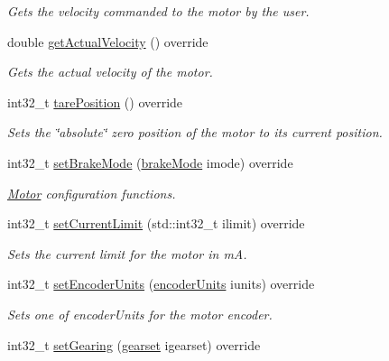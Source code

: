 \begin{DoxyCompactItemize}
\begin{DoxyCompactList}\small\item\em Gets the velocity commanded to the motor by the user. \end{DoxyCompactList}\item 
double \mbox{\hyperlink{classokapi_1_1MockMotor_a774e4436ae386aee9981c11ccd947e13}{get\+Actual\+Velocity}} () override
\begin{DoxyCompactList}\small\item\em Gets the actual velocity of the motor. \end{DoxyCompactList}\item 
int32\+\_\+t \mbox{\hyperlink{classokapi_1_1MockMotor_a80592813f7053d3468c99a7651e5514f}{tare\+Position}} () override
\begin{DoxyCompactList}\small\item\em Sets the \char`\"{}absolute\char`\"{} zero position of the motor to its current position. \end{DoxyCompactList}\item 
int32\+\_\+t \mbox{\hyperlink{classokapi_1_1MockMotor_a807d728157563cb1c5afc6eb324d31cc}{set\+Brake\+Mode}} (\mbox{\hyperlink{classokapi_1_1AbstractMotor_a132e0485dbb59a60c3f934338d8fa601}{brake\+Mode}} imode) override
\begin{DoxyCompactList}\small\item\em \mbox{\hyperlink{classokapi_1_1Motor}{Motor}} configuration functions. \end{DoxyCompactList}\item 
int32\+\_\+t \mbox{\hyperlink{classokapi_1_1MockMotor_a91cac378cf47e923beb44a681af4d830}{set\+Current\+Limit}} (std\+::int32\+\_\+t ilimit) override
\begin{DoxyCompactList}\small\item\em Sets the current limit for the motor in mA. \end{DoxyCompactList}\item 
int32\+\_\+t \mbox{\hyperlink{classokapi_1_1MockMotor_a955c121e844f7d78eecfc865b71979c5}{set\+Encoder\+Units}} (\mbox{\hyperlink{classokapi_1_1AbstractMotor_ae811cd825099f2defadeb1b7f7e7764c}{encoder\+Units}} iunits) override
\begin{DoxyCompactList}\small\item\em Sets one of encoder\+Units for the motor encoder. \end{DoxyCompactList}\item 
int32\+\_\+t \mbox{\hyperlink{classokapi_1_1MockMotor_a4e9c94656f43b69c489deeb82908e817}{set\+Gearing}} (\mbox{\hyperlink{classokapi_1_1AbstractMotor_a88aaa6ea2fa10f5520a537bbf26774d5}{gearset}} igearset) override

\end{DoxyCompactItemize}
